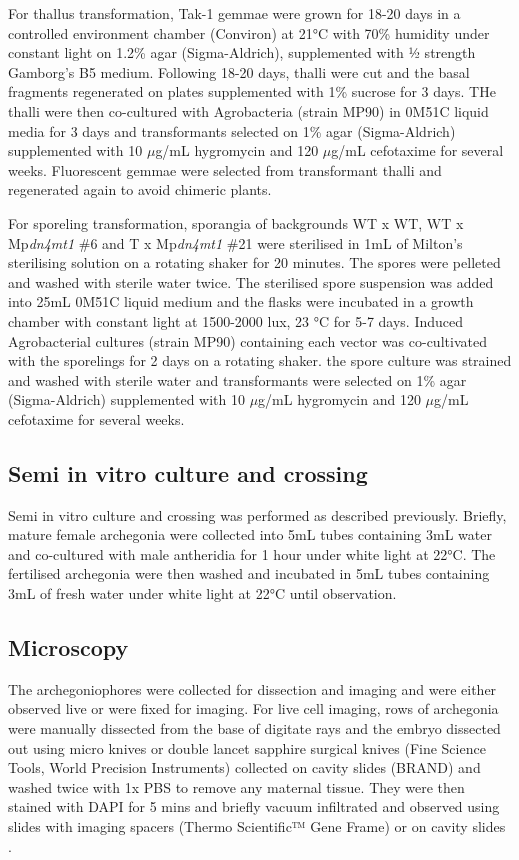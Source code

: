 For thallus transformation, Tak-1 gemmae were grown for 18-20 days in a controlled environment chamber (Conviron) at 21°C with 70\% humidity under constant light on 1.2\% agar (Sigma-Aldrich), supplemented with ½ strength Gamborg's B5 medium. Following 18-20 days, thalli were cut and the basal fragments regenerated on plates supplemented with 1\% sucrose for 3 days. THe thalli were then co-cultured with Agrobacteria (strain MP90) in 0M51C liquid media for 3 days and transformants selected on 1\% agar (Sigma-Aldrich) supplemented with 10 $\mu$g/mL hygromycin and 120 $\mu$g/mL cefotaxime for several weeks. Fluorescent gemmae were selected from transformant thalli and regenerated again to avoid chimeric plants\citep{RN147}. 

For sporeling transformation, sporangia of backgrounds WT x WT, WT x Mp\textit{dn4mt1} \#6 and T x Mp\textit{dn4mt1} \#21 were sterilised in 1mL of Milton's sterilising solution on a rotating shaker for 20 minutes. The spores were pelleted and washed with sterile water twice. The sterilised spore suspension was added into 25mL 0M51C liquid medium and the flasks were incubated in a growth chamber with constant light at 1500-2000 lux, 23 °C for 5-7 days. Induced Agrobacterial cultures (strain MP90) containing each vector was co-cultivated with the sporelings for 2 days on a rotating shaker. the spore culture was strained and washed with sterile water and transformants were selected on 1\% agar (Sigma-Aldrich) supplemented with 10 $\mu$g/mL hygromycin and 120 $\mu$g/mL cefotaxime for several weeks\citep{RN146}.

\subsection{Semi in vitro culture and crossing}

Semi in vitro culture and crossing was performed as described previously\citep{RN139}. Briefly, mature female archegonia were collected into 5mL tubes containing 3mL water and co-cultured with male antheridia for 1 hour under white light at 22°C. The fertilised archegonia were then washed and incubated in 5mL tubes containing 3mL of fresh water under white light at 22°C until observation.

\subsection{Microscopy} 

The archegoniophores were collected for dissection and imaging and were either observed live or were fixed for imaging. For live cell imaging, rows of archegonia were manually dissected from the base of digitate rays and the embryo dissected out using micro knives or double lancet sapphire surgical knives (Fine Science Tools, World Precision Instruments) collected on cavity slides (BRAND\textregistered) and washed twice with 1x PBS to remove any maternal tissue. They were then stained with DAPI for 5 mins and briefly vacuum infiltrated and observed using slides with imaging spacers (Thermo Scientific™ Gene Frame) or on cavity slides \citep{RN139}. 

